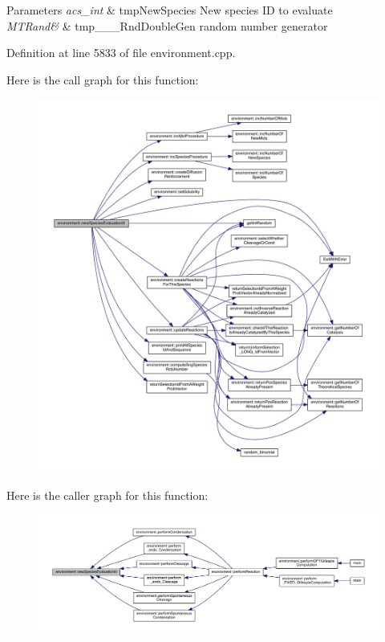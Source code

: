 \begin{DoxyParams}{Parameters}
{\em acs\-\_\-int} & tmp\-New\-Species New species I\-D to evaluate \\
\hline
{\em M\-T\-Rand\&} & tmp\-\_\-\-\_\-\-\_\-\-Rnd\-Double\-Gen random number generator \\
\hline
\end{DoxyParams}


Definition at line 5833 of file environment.\-cpp.



Here is the call graph for this function\-:
\nopagebreak
\begin{figure}[H]
\begin{center}
\leavevmode
\includegraphics[width=350pt]{a00014_a4fe7891fb38f3f25bb82769af0ddfe19_cgraph}
\end{center}
\end{figure}




Here is the caller graph for this function\-:
\nopagebreak
\begin{figure}[H]
\begin{center}
\leavevmode
\includegraphics[width=350pt]{a00014_a4fe7891fb38f3f25bb82769af0ddfe19_icgraph}
\end{center}
\end{figure}


